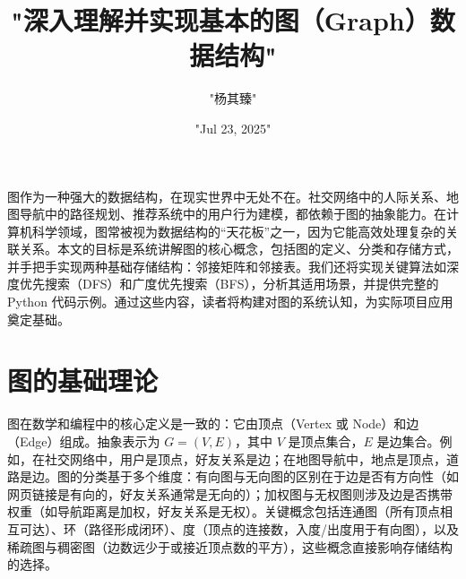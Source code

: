 \title{"深入理解并实现基本的图（Graph）数据结构"}
\author{"杨其臻"}
\date{"Jul 23, 2025"}
\maketitle
图作为一种强大的数据结构，在现实世界中无处不在。社交网络中的人际关系、地图导航中的路径规划、推荐系统中的用户行为建模，都依赖于图的抽象能力。在计算机科学领域，图常被视为数据结构的“天花板”之一，因为它能高效处理复杂的关联关系。本文的目标是系统讲解图的核心概念，包括图的定义、分类和存储方式，并手把手实现两种基础存储结构：邻接矩阵和邻接表。我们还将实现关键算法如深度优先搜索（DFS）和广度优先搜索（BFS），分析其适用场景，并提供完整的 Python 代码示例。通过这些内容，读者将构建对图的系统认知，为实际项目应用奠定基础。\par
\chapter{图的基础理论}
图在数学和编程中的核心定义是一致的：它由顶点（Vertex 或 Node）和边（Edge）组成。抽象表示为 $G = (V, E)$，其中 $V$ 是顶点集合，$E$ 是边集合。例如，在社交网络中，用户是顶点，好友关系是边；在地图导航中，地点是顶点，道路是边。图的分类基于多个维度：有向图与无向图的区别在于边是否有方向性（如网页链接是有向的，好友关系通常是无向的）；加权图与无权图则涉及边是否携带权重（如导航距离是加权，好友关系是无权）。关键概念包括连通图（所有顶点相互可达）、环（路径形成闭环）、度（顶点的连接数，入度/出度用于有向图），以及稀疏图与稠密图（边数远少于或接近顶点数的平方），这些概念直接影响存储结构的选择。\par
